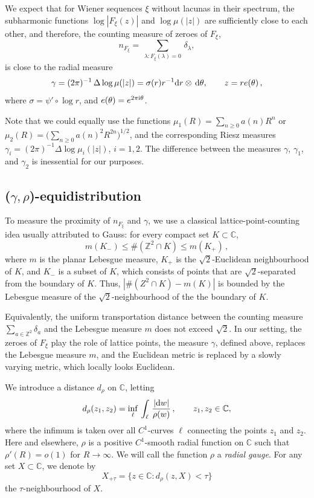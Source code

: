 \documentclass[11pt]{amsart}
\numberwithin{equation}{section}
\newcommand{\bC}{\mathbb C}
\newcommand{\bZ}{\mathbb Z}
\begin{document}
We expect that for Wiener sequences $\xi$ without lacunas in their spectrum, the subharmonic functions $\log|F_\xi(z)|$ and $\log \mu (|z|)$ are sufficiently close to each other, and therefore, the counting
measure of zeroes of $F_\xi$,
\[
n_{F_\xi} = \, \sum_{\lambda\colon F_\xi(\lambda)=0}\, \delta_\lambda,
\]
is close to the radial measure
\[
\gamma = (2\pi)^{-1}\, \Delta \log\mu (|z|) =
\sigma(r) r^{-1} {\rm d}r \otimes \, {\rm d}\theta,
\qquad z=re(\theta)\,,
\]
where $\sigma = \psi' \circ \log r$, and $e(\theta)=e^{2\pi {\rm i}\theta}$.

Note that we could
equally use the functions $\mu_1(R) = \sum_{n\ge 0} a(n)R^n$ or
$\mu_2(R)=\bigl(\sum_{n\ge 0} a(n)^2 R^{2n} \bigr)^{1/2}$, and the corresponding Riesz measures
$\gamma_i = (2\pi)^{-1}\Delta \log\mu_i (|z|)$, $i=1, 2$. The difference between the measures
$\gamma$, $\gamma_1$, and $\gamma_2$ is inessential for our purposes.



\subsection{($\gamma, \rho$)-equidistribution}
To measure the proximity of $n_{F_\xi}$ and $\gamma$, we use a classical lattice-point-counting idea usually attributed to Gauss: for every compact set $K\subset\bC$,
\[
m(K_-) \le \# (\bZ^2 \cap K) \le m(K_+)\,,
\]
where $m$ is the planar Lebesgue measure, $K_+$ is the $\sqrt{2}$-Euclidean neighbourhood of $K$,
and $K_-$ is a subset of $K$, which consists of points that are $\sqrt{2}$-separated from the boundary of $K$. 
Thus, $|\# (Z^2 \cap K) - m(K)|$ is bounded by the Lebesgue measure of the $\sqrt{2}$-neighbourhood of the the boundary of $K$. 

Equivalently, the uniform transportation distance between the counting
measure $\sum_{a\in\bZ^2} \delta_a$ and the Lebesgue measure $m$ does not exceed $\sqrt{2}$.
In our setting, the zeroes of $F_\xi$ play the role of lattice points, the measure $\gamma$, defined 
above, replaces the Lebesgue measure $m$, and the Euclidean metric is replaced by a slowly varying metric, which locally looks Euclidean.

We introduce a distance $d_\rho$ on $\bC$, letting
\[
d_\rho (z_1, z_2) = \inf_\ell\, \int_\ell\,  \frac{|{\rm d}w|}{\rho(w)}\,,
\qquad z_1, z_2\in \bC,
\]
where the infimum is taken over all $C^1$-curves $\ell$ connecting the points $z_1$ and $z_2$.
Here and elsewhere, $\rho$ is a positive $C^1$-smooth radial function on $\bC$
such that $\rho'(R) = o(1)$ for $R\to\infty$. We will call the function
$\rho$ a {\em radial gauge}. For any set $X\subset\bC$, we denote by
\[
X_{+\tau} = \{z\in\bC\colon d_\rho(z, X)< \tau\}
\]
the $\tau$-neighbourhood of $X$.
\end{document}
